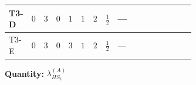 \documentclass[8pt]{article}
\begin{document}
\begin{landscape}
\begin{longtable}{@{}llcccccc >{\raggedright\arraybackslash}p{0.21\linewidth} >{\raggedright\arraybackslash}p{0.21\linewidth} >{\raggedright\arraybackslash}p{0.21\linewidth}@{}}
\midrule
T3-D & $0$ & $3$ & $0$ & $1$ & $1$ & $2$ & $\frac{1}{2}$ & --- & \scriptsize\adjustbox{max width=\linewidth}{$\begin{gathered} {\lambda_{HS_1}^{(A)}} (2 T_{\nu}^{(1)}+6 \operatorname{Tr}\!\left({Y_d}\,\left({Y_d}\right)^{\dagger}\right)+2 \operatorname{Tr}\!\left({Y_e}\,\left({Y_e}\right)^{\dagger}\right)+6 \operatorname{Tr}\!\left({Y_u}\,\left({Y_u}\right)^{\dagger}\right)+16 {\lambda_{S_1}^{(A)}})\end{gathered}$} & \scriptsize\adjustbox{max width=\linewidth}{$\begin{gathered} -\frac{33 {g_2}^2 {\lambda_{HS_1}^{(A)}}}{2}\end{gathered}$} \\
\midrule
T3-E & $0$ & $3$ & $0$ & $3$ & $1$ & $2$ & $\frac{1}{2}$ & --- & \scriptsize\adjustbox{max width=\linewidth}{$\begin{gathered} {\lambda_{HS_1}^{(A)}} (2 T_{\nu}^{(1)}+6 \operatorname{Tr}\!\left({Y_d}\,\left({Y_d}\right)^{\dagger}\right)+2 \operatorname{Tr}\!\left({Y_e}\,\left({Y_e}\right)^{\dagger}\right)+6 \operatorname{Tr}\!\left({Y_u}\,\left({Y_u}\right)^{\dagger}\right)+16 {\lambda_{S_1}^{(A)}})\end{gathered}$} & \scriptsize\adjustbox{max width=\linewidth}{$\begin{gathered} -\frac{33 {g_2}^2 {\lambda_{HS_1}^{(A)}}}{2}\end{gathered}$} \\
\midrule
\bottomrule
\end{longtable}
\clearpage
\noindent\textbf{Quantity: }$\lambda_{HS_1}^{(A)}$\par\smallskip

\end{landscape}
\end{document}
